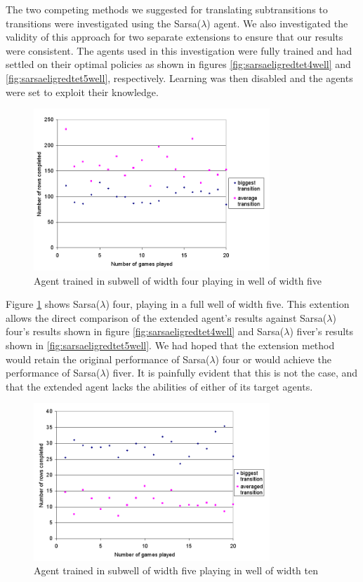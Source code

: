 \documentclass{rucsthesis}
\begin{document}
The two competing methods we suggested for translating subtransitions to transitions were investigated using the Sarsa($\lambda$) agent. We also investigated the validity of this approach for two separate extensions to ensure that our results were consistent. The agents used in this investigation were fully trained and had settled on their optimal policies as shown in figures \ref{fig:sarsaeligredtet4well} and \ref{fig:sarsaeligredtet5well}, respectively. Learning was then disabled and the agents were set to exploit their knowledge.

\begin{figure}[h]
\centering
\includegraphics[width=3.5in]{multisingle45.png}
\caption{Agent trained in subwell of width four playing in well of width five}
\label{fig:multisingle45}
\end{figure}

Figure \ref{fig:multisingle45} shows Sarsa($\lambda$) four, playing in a full well of width five. This extention allows the direct comparison of the extended agent's results against Sarsa($\lambda$) four's results shown in figure \ref{fig:sarsaeligredtet4well} and Sarsa($\lambda$) fiver's results shown in \ref{fig:sarsaeligredtet5well}. We had hoped that the extension method would retain the original performance of Sarsa($\lambda$) four or would achieve the performance of Sarsa($\lambda$) fiver.  It is painfully evident that this is not the case, and that the extended agent lacks the abilities of either of its target agents.

\begin{figure}[h]
\centering
\includegraphics[width=3.5in]{multisingle.png}
\caption{Agent trained in subwell of width five playing in well of width ten}
\label{fig:multisingle}
\end{figure}
\end{document}
